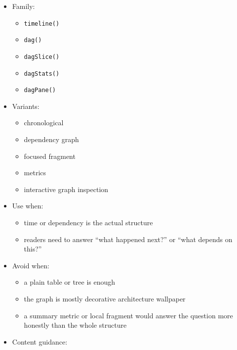 \begin{itemize}
\tightlist
\item
  Family:

  \begin{itemize}
  \tightlist
  \item
    \texttt{t\allowbreak{}i\allowbreak{}m\allowbreak{}e\allowbreak{}l\allowbreak{}i\allowbreak{}n\allowbreak{}e\allowbreak{}(\allowbreak{})}
  \item
    \texttt{d\allowbreak{}a\allowbreak{}g\allowbreak{}(\allowbreak{})}
  \item
    \texttt{d\allowbreak{}a\allowbreak{}g\allowbreak{}S\allowbreak{}l\allowbreak{}i\allowbreak{}c\allowbreak{}e\allowbreak{}(\allowbreak{})}
  \item
    \texttt{d\allowbreak{}a\allowbreak{}g\allowbreak{}S\allowbreak{}t\allowbreak{}a\allowbreak{}t\allowbreak{}s\allowbreak{}(\allowbreak{})}
  \item
    \texttt{d\allowbreak{}a\allowbreak{}g\allowbreak{}P\allowbreak{}a\allowbreak{}n\allowbreak{}e\allowbreak{}(\allowbreak{})}
  \end{itemize}
\item
  Variants:

  \begin{itemize}
  \tightlist
  \item
    chronological
  \item
    dependency graph
  \item
    focused fragment
  \item
    metrics
  \item
    interactive graph inspection
  \end{itemize}
\item
  Use when:

  \begin{itemize}
  \tightlist
  \item
    time or dependency is the actual structure
  \item
    readers need to answer ``what happened next?'' or ``what depends on this?''
  \end{itemize}
\item
  Avoid when:

  \begin{itemize}
  \tightlist
  \item
    a plain table or tree is enough
  \item
    the graph is mostly decorative architecture wallpaper
  \item
    a summary metric or local fragment would answer the question more honestly than the whole structure
  \end{itemize}
\item
  Content guidance:


\end{itemize}
